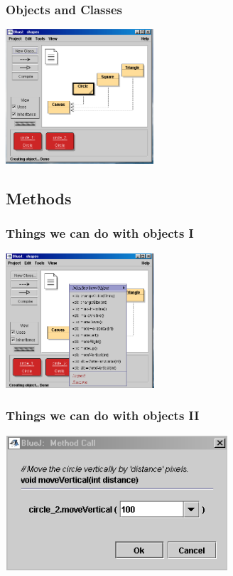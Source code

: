 \begin{frame}
\frametitle{Objects and Classes}
\begin{center}
\includegraphics[height=5cm, keepaspectratio]{./figures/blueJ}
\end{center}
\end{frame}

\subsection{Methods}

\begin{frame}
\frametitle{Things we can do with objects I}
\begin{center}
\includegraphics[height=5cm,keepaspectratio]{./figures/methods}
\end{center}
\end{frame}

\begin{frame}
\frametitle{Things we can do with objects II}
\begin{center}
\includegraphics[height=5cm,keepaspectratio]{./figures/call}
\end{center}
\end{frame}




